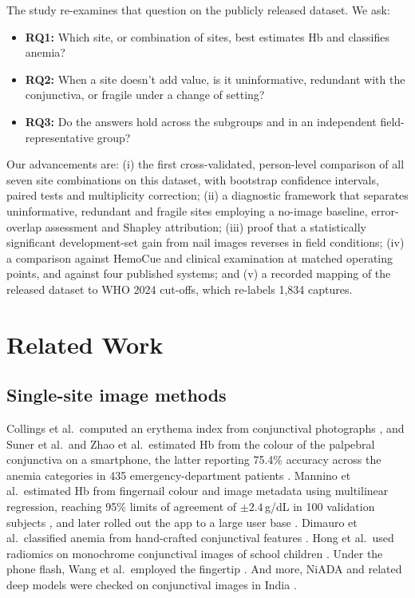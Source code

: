 \documentclass[10pt,a4paper,twocolumn]{article}
\newcommand{\gdl}{\,g/dL}
\begin{document}
The study re-examines that question on the publicly released dataset. We ask:
\begin{itemize}
\item \textbf{RQ1:} Which site, or combination of sites, best estimates Hb and classifies anemia?
\item \textbf{RQ2:} When a site doesn't add value, is it uninformative, redundant with the conjunctiva, or fragile under a change of setting?
\item \textbf{RQ3:} Do the answers hold across the subgroups and in an independent field-representative group?
\end{itemize}

\noindent Our advancements are:
(i) the first cross-validated, person-level comparison of all seven site combinations on this dataset, with bootstrap confidence intervals, paired tests and multiplicity correction;
(ii) a diagnostic framework that separates uninformative, redundant and fragile sites employing a no-image baseline, error-overlap assessment and Shapley attribution;
(iii) proof that a statistically significant development-set gain from nail images reverses in field conditions;
(iv) a comparison against HemoCue and clinical examination at matched operating points, and against four published systems; and
(v) a recorded mapping of the released dataset to WHO 2024 cut-offs, which re-labels 1,834 captures.

\section{Related Work}

\subsection{Single-site image methods}
Collings et al.\ computed an erythema index from conjunctival photographs \cite{collings2016}, and Suner et al.\ and Zhao et al.\ estimated Hb from the colour of the palpebral conjunctiva on a smartphone, the latter reporting 75.4\% accuracy across the anemia categories in 435 emergency-department patients \cite{suner2021,zhao2024}. Mannino et al.\ estimated Hb from fingernail colour and image metadata using multilinear regression, reaching 95\% limits of agreement of $\pm2.4$\gdl{} in 100 validation subjects \cite{mannino2018}, and later rolled out the app to a large user base \cite{mannino2025}. Dimauro et al.\ classified anemia from hand-crafted conjunctival features \cite{dimauro2023}. Hong et al.\ used radiomics on monochrome conjunctival images of school children \cite{hong2025}. Under the phone flash, Wang et al.\ employed the fingertip \cite{wang2016,wang2017}. And more, NiADA and related deep models were checked on conjunctival images in India \cite{das2024,sehar2025}.
\end{document}
